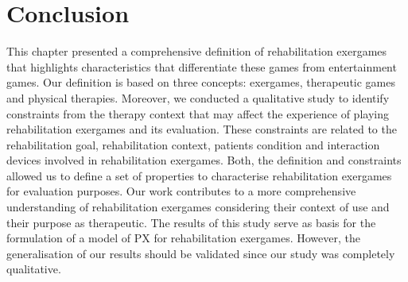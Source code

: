 
\section{Conclusion} %
\label{sec:conclusion_char}
This chapter presented a comprehensive definition of rehabilitation exergames that highlights characteristics that differentiate these games from entertainment games. Our definition is based on three concepts: exergames, therapeutic games and physical therapies. Moreover, we conducted a qualitative study to identify constraints from the therapy context that may affect the experience of playing rehabilitation exergames and its evaluation. These constraints are related to the rehabilitation goal, rehabilitation context, patients condition and interaction devices involved in rehabilitation exergames. Both, the definition and constraints allowed us to define a set of properties to characterise rehabilitation exergames for evaluation purposes. Our work contributes to a more comprehensive understanding of rehabilitation exergames considering their context of use and their purpose as therapeutic. The results of this study serve as basis for the formulation of a model of \ac{PX} for rehabilitation exergames. However, the generalisation of our results should be validated since our study was completely qualitative.